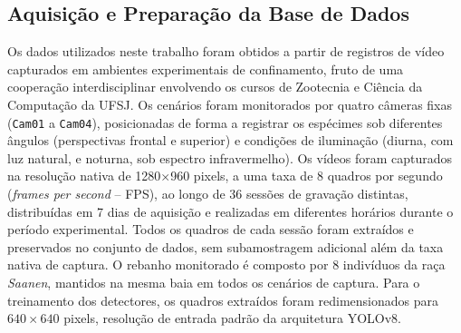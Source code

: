 \documentclass[12pt,fleqn]{article}
\begin{document}

\subsection{Aquisição e Preparação da Base de Dados}
\label{subsec:aquisicao_dados}

Os dados utilizados neste trabalho foram obtidos a partir de registros de vídeo capturados em ambientes experimentais de confinamento, fruto de uma cooperação interdisciplinar envolvendo os cursos de Zootecnia e Ciência da Computação da UFSJ. Os cenários foram monitorados por quatro câmeras fixas (\texttt{Cam01} a \texttt{Cam04}), posicionadas de forma a registrar os espécimes sob diferentes ângulos (perspectivas frontal e superior) e condições de iluminação (diurna, com luz natural, e noturna, sob espectro infravermelho). Os vídeos foram capturados na resolução nativa de 1280$\times$960 pixels, a uma taxa de 8 quadros por segundo (\textit{frames per second} -- FPS), ao longo de 36 sessões de gravação distintas, distribuídas em 7 dias de aquisição e realizadas em diferentes horários durante o período experimental. Todos os quadros de cada sessão foram extraídos e preservados no conjunto de dados, sem subamostragem adicional além da taxa nativa de captura. O rebanho monitorado é composto por 8 indivíduos da raça \textit{Saanen}, mantidos na mesma baia em todos os cenários de captura. Para o treinamento dos detectores, os quadros extraídos foram redimensionados para $640 \times 640$ pixels, resolução de entrada padrão da arquitetura YOLOv8.
\end{document}
